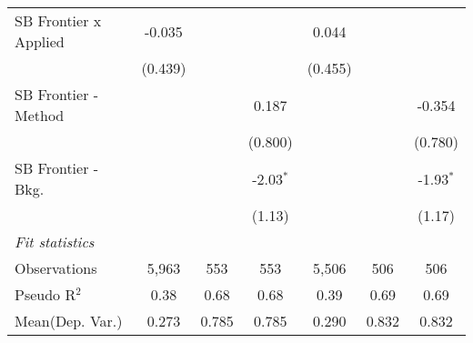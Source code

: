 \begin{tabular}{lcccccc}
   SB Frontier x Applied        & -0.035        &         &               & 0.044         &         &   \\   
                                & (0.439)       &         &               & (0.455)       &         &   \\   
   SB Frontier - Method         &               &         & 0.187         &               &         & -0.354\\   
                                &               &         & (0.800)       &               &         & (0.780)\\   
   SB Frontier - Bkg.           &               &         & -2.03$^{*}$   &               &         & -1.93$^{*}$\\   
                                &               &         & (1.13)        &               &         & (1.17)\\   
   \midrule
   \emph{Fit statistics}\\
   Observations                 & 5,963         & 553     & 553           & 5,506         & 506     & 506\\  
   Pseudo R$^2$                 & 0.38          & 0.68    & 0.68          & 0.39          & 0.69    & 0.69\\  
Mean(Dep. Var.) & 0.273 & 0.785 & 0.785 & 0.290 & 0.832 & 0.832 \\
   

\end{tabular}
